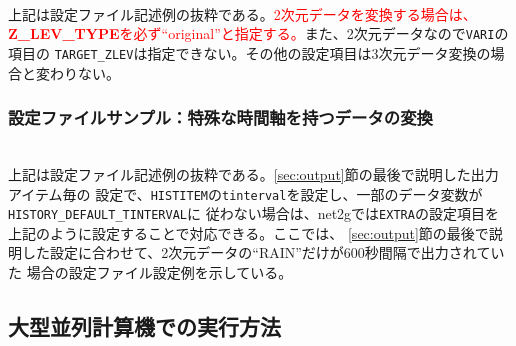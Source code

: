 \\

\noindent 上記は設定ファイル記述例の抜粋である。\textcolor{red}{2次元データを変換する場合は、
{\bf Z\_LEV\_TYPE}を必ず``original''と指定する。}また、2次元データなので\verb|VARI|の項目の
\verb|TARGET_ZLEV|は指定できない。その他の設定項目は3次元データ変換の場合と変わりない。


\subsubsection{設定ファイルサンプル：特殊な時間軸を持つデータの変換}

\\

\noindent 上記は設定ファイル記述例の抜粋である。\ref{sec:output}節の最後で説明した出力アイテム毎の
設定で、\verb|HISTITEM|の\verb|tinterval|を設定し、一部のデータ変数が\verb|HISTORY_DEFAULT_TINTERVAL|に
従わない場合は、net2gでは\verb|EXTRA|の設定項目を上記のように設定することで対応できる。ここでは、
\ref{sec:output}節の最後で説明した設定に合わせて、2次元データの``RAIN''だけが600秒間隔で出力されていた
場合の設定ファイル設定例を示している。


\subsection{大型並列計算機での実行方法}

